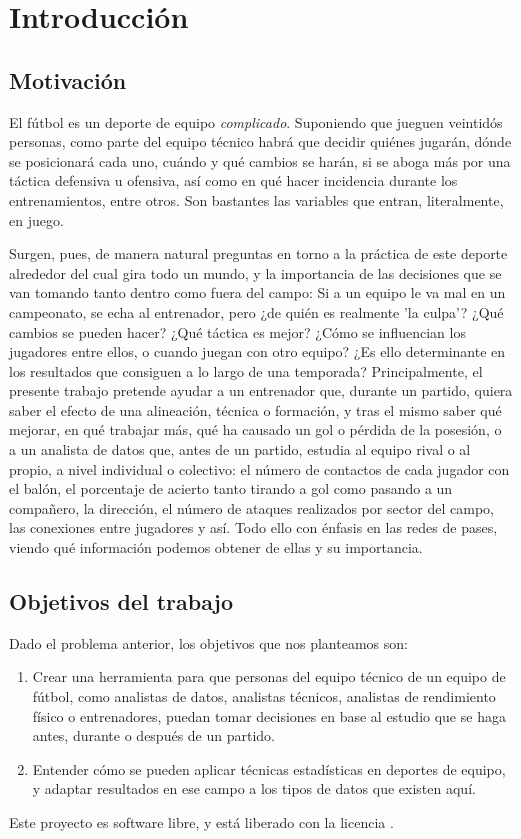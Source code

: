 \chapter{Introducción}

\section{Motivación}
El fútbol es un deporte de equipo  \textit{complicado}. Suponiendo que 
jueguen veintidós personas, como parte del equipo técnico habrá que 
decidir quiénes jugarán, dónde se posicionará cada uno, cuándo y qué 
cambios se harán, si se aboga más por una táctica defensiva u ofensiva, 
así como en qué hacer incidencia durante los entrenamientos, entre otros. 
Son bastantes las variables que entran, literalmente, en juego. 

Surgen, pues, de manera natural preguntas en torno a la práctica de 
este deporte alrededor del cual gira todo un mundo, y la importancia 
de las decisiones que se van tomando tanto dentro como fuera del 
campo: Si a un equipo le va mal en un campeonato, se echa al entrenador, pero ¿de quién 
es realmente 'la culpa'? ¿Qué cambios se pueden hacer? ¿Qué táctica es mejor? ¿Cómo se influencian los 
jugadores entre ellos, o cuando juegan con otro equipo? ¿Es ello determinante en los 
resultados que consiguen a lo largo de una temporada? 
Principalmente,  el presente trabajo pretende ayudar a un 
entrenador que, durante un partido, quiera saber el efecto de una 
alineación, técnica o formación, y tras el mismo saber 
qué mejorar, en qué trabajar más, qué ha causado un gol o pérdida 
de la posesión, o a un analista de datos que, antes de un partido, 
estudia al equipo rival o al propio, a nivel individual o colectivo: 
el número de contactos de cada jugador con el balón, el porcentaje 
de acierto tanto tirando a gol como pasando a un compañero, la 
dirección, el número de ataques realizados por sector del campo, 
las conexiones entre jugadores y así. Todo ello con énfasis en las 
redes de pases, viendo qué información podemos obtener de ellas y su 
importancia.

\section{Objetivos del trabajo} \label{sect:goals}

Dado el problema anterior, los objetivos que nos planteamos son:

\begin{enumerate}
    \item \label{obj:1} Crear una herramienta para que personas del equipo 
    técnico de un equipo de fútbol, como analistas de datos, analistas técnicos, analistas de rendimiento 
    físico o entrenadores, puedan tomar decisiones en base al estudio que se haga antes, durante 
    o después de un partido. 
    \item \label{obj:2} Entender cómo se pueden aplicar técnicas estadísticas en deportes de equipo, 
    y adaptar resultados en ese campo a los tipos de datos que existen aquí.
\end{enumerate}

Este proyecto es software libre, y está liberado con la licencia \cite{gplv3}.
